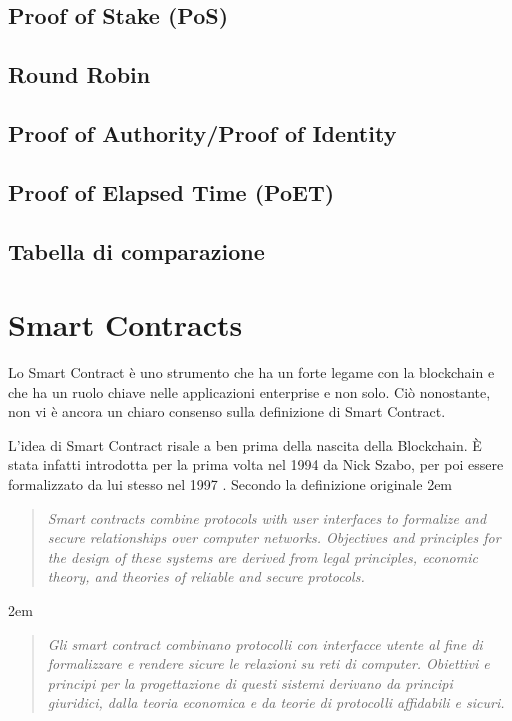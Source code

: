 \subsection{Proof of Stake (PoS)}

\subsection{Round Robin}

\subsection{Proof of Authority/Proof of Identity}

\subsection{Proof of Elapsed Time (PoET)}

\subsection{Tabella di comparazione}

\section{Smart Contracts}
Lo Smart Contract è uno strumento che ha un forte legame con la blockchain e che ha un ruolo chiave
nelle applicazioni enterprise e non solo.
Ciò nonostante, non vi è ancora un chiaro consenso sulla definizione di Smart Contract.

L'idea di Smart Contract risale a ben prima della nascita della Blockchain. È stata infatti introdotta
per la prima volta nel 1994 da Nick Szabo, per poi
essere formalizzato da lui stesso nel 1997 \cite{szabo-smart-contracts}.
Secondo la definizione originale
\begingroup
\advance\leftmargini 2em
\begin{quote}
	{
		{\em Smart contracts combine protocols with user interfaces to formalize
				and secure relationships over computer networks.
				Objectives and principles for the design of these systems
				are derived from legal principles, economic theory,
				and theories of reliable and secure protocols.}
	}
\end{quote}
\endgroup
\begingroup
\advance\leftmargini 2em
\begin{quote}
	{
		{\em Gli smart contract combinano protocolli con interfacce utente
				al fine di formalizzare e rendere sicure
				le relazioni su reti di computer.
				Obiettivi e principi per la progettazione di questi sistemi
				derivano da principi giuridici, dalla teoria economica
				e da teorie di protocolli affidabili e sicuri.}
	}
\end{quote}
\endgroup

